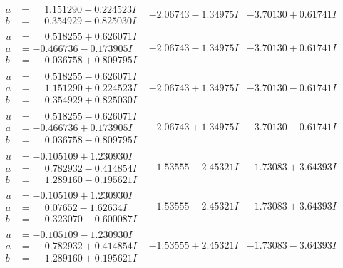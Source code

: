 \documentclass[1p]{elsarticle_modified}
\theoremstyle{definition}
\begin{document}
$$\begin{array}{c|c|c}
\begin{aligned}
a &= \phantom{-}1.151290 - 0.224523 I \\
b &= \phantom{-}0.354929 - 0.825030 I\end{aligned}
 & -2.06743 - 1.34975 I & -3.70130 + 0.61741 I \\ \hline\begin{aligned}
u &= \phantom{-}0.518255 + 0.626071 I \\
a &= -0.466736 - 0.173905 I \\
b &= \phantom{-}0.036758 + 0.809795 I\end{aligned}
 & -2.06743 - 1.34975 I & -3.70130 + 0.61741 I \\ \hline\begin{aligned}
u &= \phantom{-}0.518255 - 0.626071 I \\
a &= \phantom{-}1.151290 + 0.224523 I \\
b &= \phantom{-}0.354929 + 0.825030 I\end{aligned}
 & -2.06743 + 1.34975 I & -3.70130 - 0.61741 I \\ \hline\begin{aligned}
u &= \phantom{-}0.518255 - 0.626071 I \\
a &= -0.466736 + 0.173905 I \\
b &= \phantom{-}0.036758 - 0.809795 I\end{aligned}
 & -2.06743 + 1.34975 I & -3.70130 - 0.61741 I \\ \hline\begin{aligned}
u &= -0.105109 + 1.230930 I \\
a &= \phantom{-}0.782932 - 0.414854 I \\
b &= \phantom{-}1.289160 - 0.195621 I\end{aligned}
 & -1.53555 - 2.45321 I & -1.73083 + 3.64393 I \\ \hline\begin{aligned}
u &= -0.105109 + 1.230930 I \\
a &= \phantom{-}0.07652 - 1.62634 I \\
b &= \phantom{-}0.323070 - 0.600087 I\end{aligned}
 & -1.53555 - 2.45321 I & -1.73083 + 3.64393 I \\ \hline\begin{aligned}
u &= -0.105109 - 1.230930 I \\
a &= \phantom{-}0.782932 + 0.414854 I \\
b &= \phantom{-}1.289160 + 0.195621 I\end{aligned}
 & -1.53555 + 2.45321 I & -1.73083 - 3.64393 I \\ \hline\begin{aligned}

\end{aligned}
\end{array}$$
\end{document}
